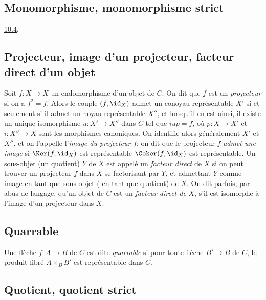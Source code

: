 \subsection{Monomorphisme, monomorphisme
  strict}

\etc \Cf \hyperref[I.sec10.4]{10.4}.

\subsection{Projecteur, image d'un projecteur, facteur direct d'un
objet}

Soit $f:X\rightarrow X$ un endomorphisme d'un objet de $C$. On dit
que $f$ est un \emph{projecteur} si on a $f^2=f$. Alors le couple
$(f,\id_X)$ admet un conoyau représentable $X'$ si et seulement si
il admet un noyau représentable $X''$, et lorsqu'il en est ainsi, il
existe un unique isomorphisme $u:X'\rightarrow X''$ dans $C$ tel que
$iup=f$, où $p:X\rightarrow X'$ et $i:X''\rightarrow X$ sont les
morphismes canoniques.
On identifie alors généralement $X'$ et
$X''$, et on l'appelle l'\emph{image du projecteur} $f$; on dit que
le projecteur $f$ \emph{admet une image} si $\Ker(f,\id_X)$ est
représentable \ie $\Coker(f,\id_X)$ est représentable. Un sous-objet
(\resp un quotient) $Y$ de $X$ est appelé un \emph{facteur direct}
de $X$ si on peut trouver un projecteur $f$ dans $X$ se factorisant
par $Y$, et admettant $Y$ comme image en tant que sous-objet (\resp
en tant que quotient) de $X$. On dit parfois, par abus de langage,
qu'un objet de $C$ est un \emph{facteur direct de} $X$, s'il est
isomorphe à l'image d'un projecteur dans $X$.

\subsection{Quarrable}

Une flèche $f:A\rightarrow B$ de $C$ est dite \emph{quarrable} si
pour toute flèche $B'\rightarrow B$ de $C$, le produit fibré
$A\times_B B'$ est représentable dans $C$.

\subsection{Quotient, quotient strict}

